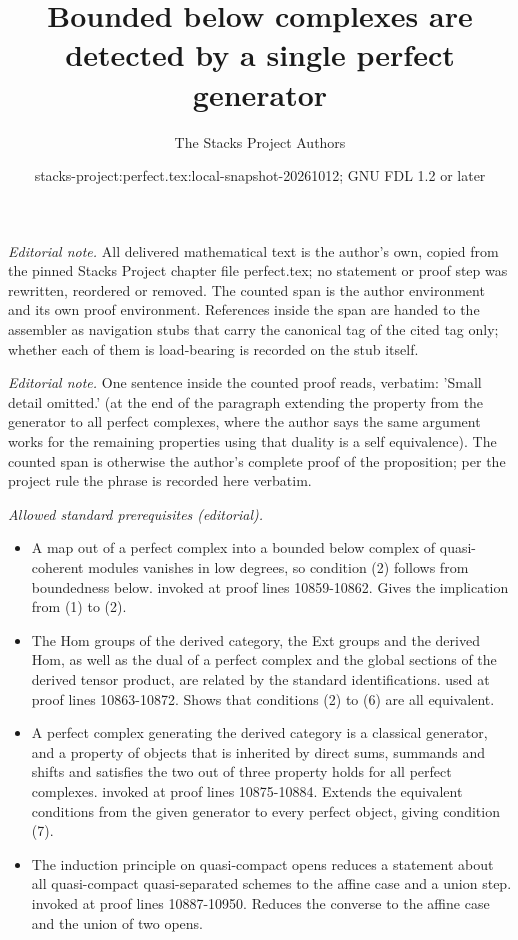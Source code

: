 \documentclass{stacks-project}
\title{Bounded below complexes are detected by a single perfect generator}
\author{The Stacks Project Authors}
\date{stacks-project:perfect.tex:local-snapshot-20261012; GNU FDL 1.2 or later}
\theoremstyle{plain}
\theoremstyle{definition}
\theoremstyle{remark}
\numberwithin{equation}{subsection}
\begin{document}
\maketitle
\setcounter{subsection}{1}
\noindent\textit{Editorial note.} All delivered mathematical text is the author's own, copied from the pinned Stacks Project chapter file perfect.tex; no statement or proof step was rewritten, reordered or removed. The counted span is the author environment and its own proof environment. References inside the span are handed to the assembler as navigation stubs that carry the canonical tag of the cited tag only; whether each of them is load-bearing is recorded on the stub itself.\par\medskip
\noindent\textit{Editorial note.} One sentence inside the counted proof reads, verbatim: 'Small detail omitted.' (at the end of the paragraph extending the property from the generator to all perfect complexes, where the author says the same argument works for the remaining properties using that duality is a self equivalence). The counted span is otherwise the author's complete proof of the proposition; per the project rule the phrase is recorded here verbatim.\par\medskip
\noindent\textit{Allowed standard prerequisites (editorial).}\begin{itemize}
\item A map out of a perfect complex into a bounded below complex of quasi-coherent modules vanishes in low degrees, so condition (2) follows from boundedness below. invoked at proof lines 10859-10862. Gives the implication from (1) to (2).
\item The Hom groups of the derived category, the Ext groups and the derived Hom, as well as the dual of a perfect complex and the global sections of the derived tensor product, are related by the standard identifications. used at proof lines 10863-10872. Shows that conditions (2) to (6) are all equivalent.
\item A perfect complex generating the derived category is a classical generator, and a property of objects that is inherited by direct sums, summands and shifts and satisfies the two out of three property holds for all perfect complexes. invoked at proof lines 10875-10884. Extends the equivalent conditions from the given generator to every perfect object, giving condition (7).
\item The induction principle on quasi-compact opens reduces a statement about all quasi-compact quasi-separated schemes to the affine case and a union step. invoked at proof lines 10887-10950. Reduces the converse to the affine case and the union of two opens.
\end{itemize}\medskip
\end{document}

